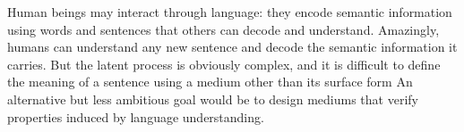 


Human beings may interact through language: they encode semantic information using words and sentences that others can decode and understand. Amazingly, humans can understand any new sentence and decode the semantic information it carries. But the latent process is obviously complex, and it is difficult to define the meaning of a sentence using a medium other than its surface form
An alternative but less ambitious goal would be to design mediums that verify properties induced by language understanding.

